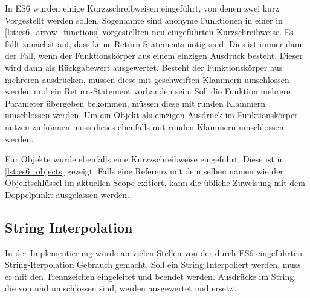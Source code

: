 In ES6 wurden einige Kurzzschreibweisen eingeführt, von denen zwei kurz
Vorgestellt werden sollen.  Sogenannte 
sind anonyme Funktionen in einer in \cref{lst:es6_arrow_functions} vorgestellten
neu eingeführten Kurzschreibweise.  Es fällt zunächst auf, dass keine
Return-Statements nötig sind.  Dies ist immer dann der Fall, wenn der
Funktionskörper aus einem einzigen Ausdruck besteht.  Dieser wird dann als
Rückgabewert ausgewertet.  Besteht der Funktionskörper aus mehreren ausdrücken,
müssen diese mit geschweiften Klammern umschlossen werden und ein
Return-Statement vorhanden sein.  Soll die Funktion mehrere Parameter übergeben
bekommen, müssen diese mit runden Klammern umschlossen werden.  Um ein Objekt
als einzigen Ausdruck im Funktionskörper nutzen zu können muss dieses ebenfalls
mit runden Klammern umschlossen werden.



Für Objekte wurde ebenfalls eine Kurzzschreibweise eingeführt. Diese ist in
\cref{lst:es6_objects} gezeigt.  Falls eine Referenz mit dem selben namen wie
der Objektschlüssel im aktuellen Scope exitiert, kann die übliche Zuweisung mit
dem Doppelpunkt ausgelassen werden.



\subsection{String Interpolation}
\label{sssec:ges_string_interpolation}

In der Implementierung wurde an vielen Stellen von der durch ES6 eingeführten
String-Iterpolation Gebrauch gemacht.  Soll ein String Interpoliert werden, muss
er mit den Trennzeichen  eingeleitet und beendet werden.  Ausdrücke im
String, die von \code{\$\{} und \code{\}} umschlossen sind, werden ausgewertet
und ersetzt.

